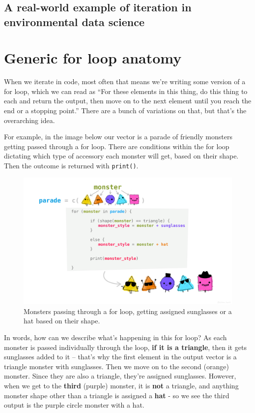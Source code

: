 \documentclass[
]{book}
\begin{document}
\hypertarget{a-real-world-example-of-iteration-in-environmental-data-science}{%
\subsection{A real-world example of iteration in environmental data science}\label{a-real-world-example-of-iteration-in-environmental-data-science}}

\hypertarget{generic-for-loop-anatomy}{%
\section{Generic for loop anatomy}\label{generic-for-loop-anatomy}}

When we iterate in code, most often that means we're writing some version of a for loop, which we can read as ``For these elements in this thing, do this thing to each and return the output, then move on to the next element until you reach the end or a stopping point.'' There are a bunch of variations on that, but that's the overarching idea.

For example, in the image below our vector is a parade of friendly monsters getting passed through a for loop. There are conditions within the for loop dictating which type of accessory each monster will get, based on their shape. Then the outcome is returned with \texttt{print()}.

\begin{figure}
\centering
\includegraphics[width=6.96875in,height=\textheight]{images/for_loop_monsters.png}
\caption{Monsters passing through a for loop, getting assigned sunglasses or a hat based on their shape.}
\end{figure}

In words, how can we describe what's happening in this for loop? As each monster is passed individually through the loop, \textbf{if it is a triangle}, then it gets sunglasses added to it -- that's why the first element in the output vector is a triangle monster with sunglasses. Then we move on to the second (orange) monster. Since they are also a triangle, they're assigned sunglasses. However, when we get to the \textbf{third} (purple) monster, it is \textbf{not} a triangle, and anything monster shape other than a triangle is assigned a \textbf{hat} - so we see the third output is the purple circle monster with a hat.
\end{document}
